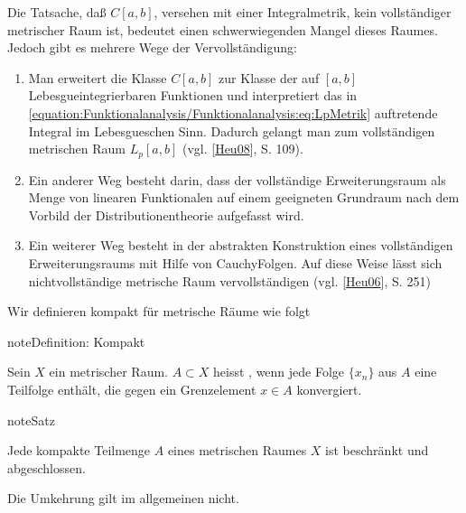 \documentclass[letterpaper,10pt,english]{jupyterBook}
\begin{document}
Die Tatsache, daß \(C[a,b]\), versehen mit einer Integralmetrik, kein vollständiger metrischer Raum ist, bedeutet einen schwerwiegenden Mangel dieses Raumes. Jedoch gibt es mehrere Wege der Vervollständigung:
\begin{enumerate}
%
\item {} 
Man erweitert die Klasse \(C[a,b]\) zur Klasse der auf \([a,b]\) Lebesgue\sphinxhyphen{}integrierbaren Funktionen und interpretiert das in \eqref{equation:Funktionalanalysis/Funktionalanalysis:eq:LpMetrik} auftretende Integral im Lebesgueschen Sinn. Dadurch gelangt man zum vollständigen metrischen Raum \(L_p[a, b]\) (vgl. {[}\hyperlink{cite.Appendix:id3}{Heu08}{]}, S. 109).

\item {} 
Ein anderer Weg besteht darin, dass der vollständige Erweiterungsraum als Menge von linearen Funktionalen auf einem geeigneten Grundraum nach dem Vorbild der Distributionentheorie aufgefasst wird.

\item {} 
Ein weiterer Weg besteht in der abstrakten Konstruktion eines vollständigen Erweiterungsraums mit Hilfe von Cauchy\sphinxhyphen{}Folgen. Auf diese Weise lässt sich  nichtvollständige metrische Raum vervollständigen (vgl. {[}\hyperlink{cite.Appendix:id4}{Heu06}{]}, S. 251)

\end{enumerate}

Wir definieren kompakt für metrische Räume wie folgt

\begin{sphinxadmonition}{note}{Definition: Kompakt}

Sein \(X\) ein metrischer Raum. \(A \subset X\) heisst , wenn jede Folge \(\{x_n\}\) aus \(A\) eine Teilfolge enthält, die gegen ein Grenzelement \(x\in A\) konvergiert.
\end{sphinxadmonition}

\begin{sphinxadmonition}{note}{Satz}

Jede kompakte Teilmenge \(A\) eines metrischen Raumes \(X\) ist beschränkt und abgeschlossen.
\end{sphinxadmonition}

Die Umkehrung gilt im allgemeinen nicht.
\end{document}

